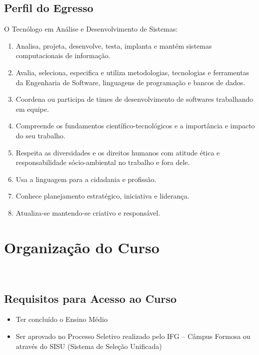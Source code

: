 \documentclass[11pt,fleqn]{book} %
\begin{document}
\section{Perfil do Egresso}
O Tecnólogo em Análise e Desenvolvimento de Sistemas:
\begin{enumerate}
	\item Analisa, projeta, desenvolve, testa, implanta e mantém sistemas computacionais de informação. 
	\item Avalia, seleciona, especifica e utiliza metodologias, tecnologias e ferramentas da Engenharia de Software, linguagens de programação e bancos de dados. 
	\item Coordena ou participa de times de desenvolvimento de softwares trabalhando em equipe.
	\item Compreende os fundamentos científico-tecnológicos e a importância e impacto do seu trabalho.
	\item Respeita as diversidades e os direitos humanos com atitude ética e responsabilidade sócio-ambiental no trabalho e fora dele.
	\item Usa a linguagem para a cidadania e profissão.
	\item Conhece planejamento estratégico, iniciativa e liderança.
	\item Atualiza-se mantendo-se criativo e responsável.
\end{enumerate}

\chapter{Organização do Curso}\label{organizacao}
\vspace{6em}
\begin{flushright}
	\textit{\textcolor{white}{Um bonita citação...}}
\end{flushright}
\vspace{6em}

\section{Requisitos para Acesso ao Curso}

\begin{itemize}
	\item Ter concluído o Ensino Médio
	\item Ser aprovado no Processo Seletivo realizado pelo IFG – Câmpus Formosa ou através do SISU (Sistema de Seleção Unificada)
\end{itemize}
\end{document}

